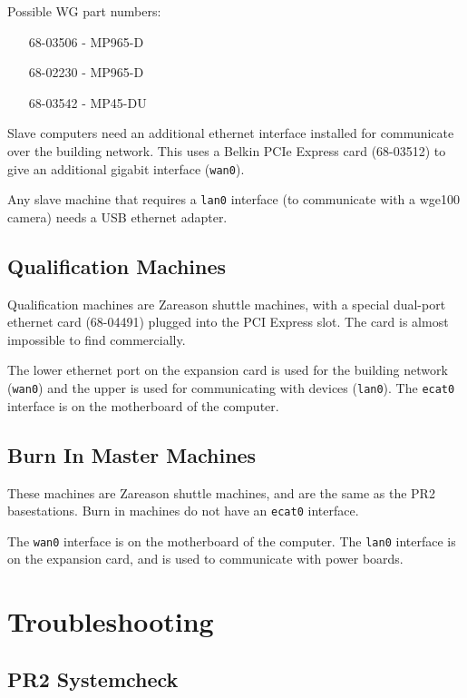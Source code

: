 \documentclass[11pt]{report}
\begin{document}
Possible WG part numbers:
\begin{itemize}
\item [68-03506] - MP965-D
\item [68-02230] - MP965-D
\item [68-03542] - MP45-DU
\end{itemize}

Slave computers need an additional ethernet interface installed for communicate over the building network. This uses a Belkin PCIe Express card (68-03512) to give an additional gigabit interface (\texttt{wan0}).

Any slave machine that requires a \texttt{lan0} interface (to communicate with a wge100 camera) needs a USB ethernet adapter. 

\subsection{Qualification Machines}

Qualification machines are Zareason shuttle machines, with a special dual-port ethernet card (68-04491) plugged into the PCI Express slot. The card is almost impossible to find commercially.

The lower ethernet port on the expansion card is used for the building network (\texttt{wan0}) and the upper is used for communicating with devices (\texttt{lan0}). The \texttt{ecat0} interface is on the motherboard of the computer.

\subsection{Burn In Master Machines}

These machines are Zareason shuttle machines, and are the same as the PR2 basestations. Burn in machines do not have an \texttt{ecat0} interface.

The \texttt{wan0} interface is on the motherboard of the computer. The \texttt{lan0} interface is on the expansion card, and is used to communicate with power boards.

\section{Troubleshooting}

\subsection{PR2 Systemcheck}
\end{document}
